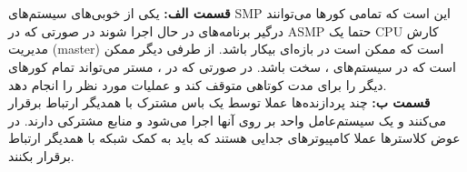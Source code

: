 ~\\
\\\textbf{قسمت الف:}
یکی از خوبی‌های سیستم‌های
SMP
این است که تمامی کور‌ها می‌توانند درگیر برنامه‌های در حال اجرا شوند در صورتی که در
ASMP
حتما یک
CPU
کارش مدیریت
(master)
است که ممکن است در بازه‌ای بیکار باشد.
از طرفی دیگر ممکن است که در سیستم‌های
،
سخت باشد. در صورتی که در
،
مستر می‌تواند تمام کور‌های دیگر را برای مدت کوتاهی متوقف کند و عملیات مورد نظر را انجام دهد.
\\\textbf{قسمت ب:}
چند پردازنده‌ها عملا توسط یک باس مشترک با همدیگر ارتباط برقرار می‌کنند و یک سیستم‌عامل
واحد بر روی آنها اجرا می‌شود و منابع مشترکی دارند.
در عوض کلاستر‌ها عملا کامپیوتر‌های جدایی هستند که باید به کمک شبکه با همدیگر ارتباط برقرار بکنند.